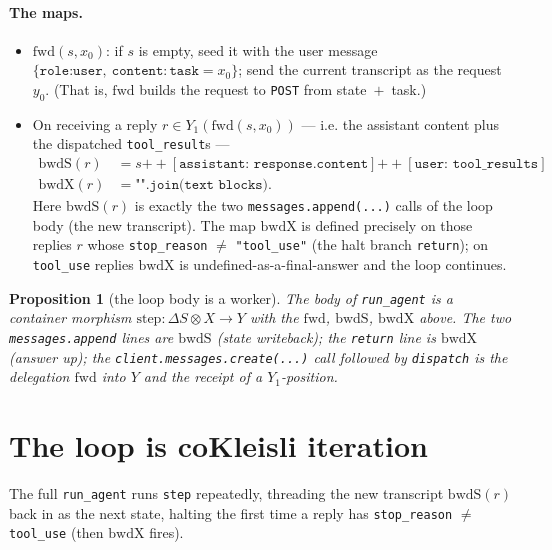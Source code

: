 \documentclass[11pt]{article}
\theoremstyle{plain}
\newtheorem{proposition}{Proposition}
\theoremstyle{definition}
\theoremstyle{remark}
\newcommand{\state}{\Delta}
\begin{document}
\paragraph{The maps.}
\begin{itemize}
  \item $\mathrm{fwd}(s, x_0)$: if $s$ is empty, seed it with the user message
  $\{\texttt{role:user},\ \texttt{content}:\texttt{task}=x_0\}$; send the current transcript
  as the request $y_0$. (That is, $\mathrm{fwd}$ builds the request to \texttt{POST} from
  state~$+$~task.)

  \item On receiving a reply $r \in Y_1(\mathrm{fwd}(s,x_0))$ --- i.e. the assistant content
  plus the dispatched \texttt{tool\_result}s ---
  \begin{align*}
    \mathrm{bwdS}(r) &= s \mathbin{{+}{+}} [\texttt{assistant: response.content}]
      \mathbin{{+}{+}} [\texttt{user: tool\_results}]\\
    \mathrm{bwdX}(r) &= \texttt{"".join(text blocks)} .
  \end{align*}
  Here $\mathrm{bwdS}(r)$ is exactly the two \texttt{messages.append(...)} calls of the loop
  body (the new transcript). The map $\mathrm{bwdX}$ is defined precisely on those replies
  $r$ whose \texttt{stop\_reason} $\neq$ \texttt{"tool\_use"} (the halt branch
  \texttt{return}); on \texttt{tool\_use} replies $\mathrm{bwdX}$ is undefined-as-a-final-answer
  and the loop continues.
\end{itemize}

\begin{proposition}[the loop body is a worker]
The body of \texttt{run\_agent} is a container morphism
$\mathrm{step} : \state S \otimes X \to Y$ with the $\mathrm{fwd}$, $\mathrm{bwdS}$,
$\mathrm{bwdX}$ above. The two \texttt{messages.append} lines \emph{are} $\mathrm{bwdS}$
(state writeback); the \texttt{return} line \emph{is} $\mathrm{bwdX}$ (answer up); the
\texttt{client.messages.create(...)} call followed by \texttt{dispatch} \emph{is} the
delegation $\mathrm{fwd}$ into $Y$ and the receipt of a $Y_1$-position.
\end{proposition}

\section{The loop is coKleisli iteration}

The full \texttt{run\_agent} runs \texttt{step} repeatedly, threading the new transcript
$\mathrm{bwdS}(r)$ back in as the next state, halting the first time a reply has
\texttt{stop\_reason} $\neq$ \texttt{tool\_use} (then $\mathrm{bwdX}$ fires).
\end{document}

